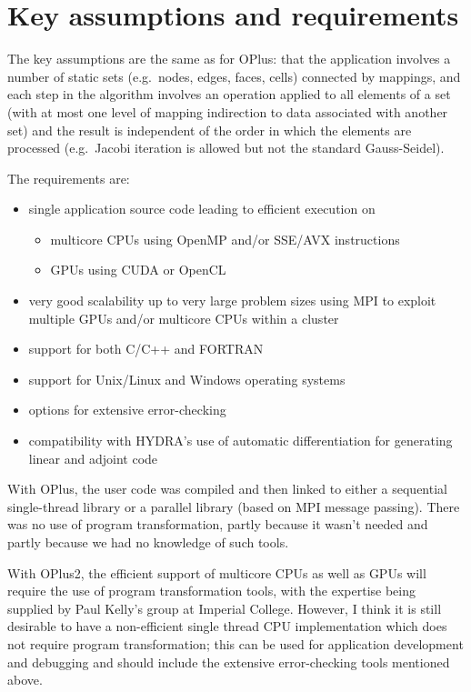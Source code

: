 \documentclass[12pt]{article}
\begin{document}
\newpage

\section{Key assumptions and requirements}

The key assumptions are the same as for OPlus: that the 
application involves a number of static sets (e.g.~nodes, edges, 
faces, cells) connected by mappings, and each step in the algorithm 
involves an operation applied to all elements of a set (with at
most one level of mapping indirection to data associated with another
set) and the result is independent of the order in which the elements 
are processed (e.g.~Jacobi iteration is allowed but not the standard 
Gauss-Seidel).

The requirements are:
\begin{itemize}
\item
single application source code leading to efficient execution on 
\begin{itemize}
\item
multicore CPUs using OpenMP and/or SSE/AVX instructions
\item
GPUs using CUDA or OpenCL
\end{itemize}

\item
very good scalability up to very large problem sizes using MPI 
to exploit multiple GPUs and/or multicore CPUs within a cluster

\item 
support for both C/C++ and FORTRAN

\item
support for Unix/Linux and Windows operating systems

\item
options for extensive error-checking

\item
compatibility with HYDRA's use of automatic differentiation 
for generating linear and adjoint code

\end{itemize}

With OPlus, the user code was compiled and then linked to either a 
sequential single-thread library or a parallel library (based on MPI
message passing).  There was no use of program transformation, partly 
because it wasn't needed and partly because we had no knowledge of 
such tools.

With OPlus2, the efficient support of multicore CPUs as well as GPUs 
will require the use of program transformation tools, with the expertise 
being supplied by Paul Kelly's group at Imperial College.
However, I think it is still desirable to have a non-efficient single 
thread CPU implementation which does not require program transformation; 
this can be used for application development and debugging and should 
include the extensive error-checking tools mentioned above.
\end{document}
